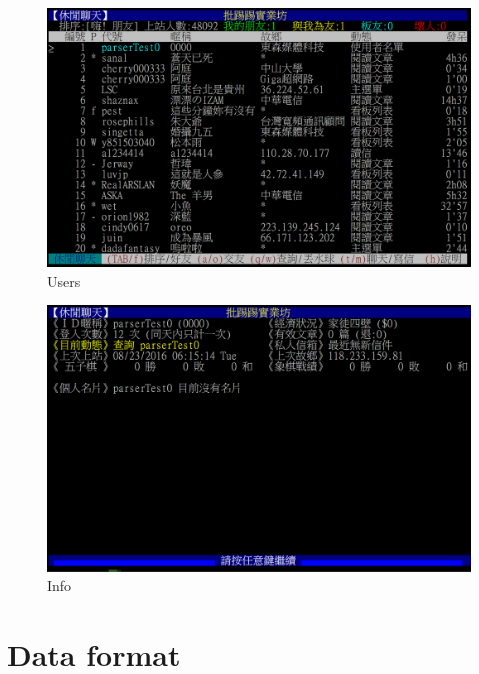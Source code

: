 \documentclass{beamer}
\begin{document}
\begin{figure}[t]
    \centering
    \includegraphics[width=1.0\textwidth]{figures/s3.png}
    \caption{Users}
\end{figure}
\begin{figure}[t]
    \centering
    \includegraphics[width=1.0\textwidth]{figures/s4.png}
    \caption{Info}
\end{figure}

\section{Data format}
\end{document}
